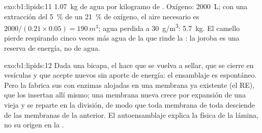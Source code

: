 \begin{solution}{exo:b1:lipids:11}
\qty{1.07}{kg} de agua por kilogramo de . Oxígeno: \qty{2000}{L}; con
una extracción del \qty{5}{\%} de un \qty{21}{\%} de oxígeno, el aire
necesario es $2000/(0.21\times 0.05) = \qty{190}{m^3}$; agua perdida a
\qty{30}{g/m^3}: \qty{5.7}{kg}. El camello pierde respirando cinco veces más
agua de la que rinde la : la joroba es una reserva de energía, no de
agua.
\end{solution}

\begin{solution}{exo:b1:lipids:12}
Dada una bicapa, el  hace que se vuelva a sellar, que se
cierre en vesículas y que acepte  nuevos sin aporte de energía: el
ensamblaje es espontáneo. Pero la  fabrica sus  con enzimas
alojadas en una membrana ya existente (el RE), que los insertan allí mismo;
una membrana nueva crece por expansión de una vieja y se reparte en la
división, de modo que toda membrana de toda  desciende de las
membranas de la  anterior. El autoensamblaje explica la física de la
lámina, no su origen en la .
\end{solution}

